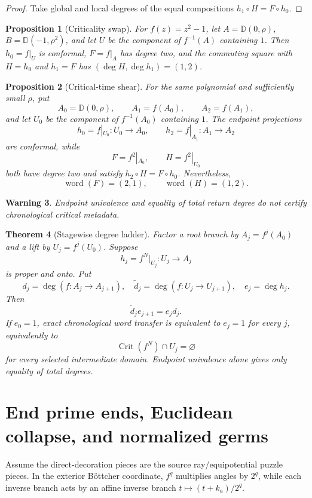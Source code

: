 \documentclass[11pt]{article}
\newtheorem{theorem}{Theorem}[section]
\newtheorem{proposition}[theorem]{Proposition}
\newtheorem{warning}[theorem]{Warning}
\theoremstyle{definition}
\theoremstyle{remark}
\newcommand{\Crit}{\operatorname{Crit}}
\newcommand{\word}{\operatorname{word}}
\newcommand{\D}{\mathbb D}
\begin{document}
\begin{proof}
Take global and local degrees of the equal compositions $h_1\circ H=F\circ h_0$.
\end{proof}

\begin{proposition}[Criticality swap]\label{prop:swap}
For $f(z)=z^2-1$, let $A=\D(0,\rho)$, $B=\D(-1,\rho^2)$, and let $U$ be the component of $f^{-1}(A)$ containing $1$.  Then $h_0=f|_U$ is conformal, $F=f|_A$ has degree two, and the commuting square with $H=h_0$ and $h_1=F$ has $(\deg H,\deg h_1)=(1,2)$.
\end{proposition}

\begin{proposition}[Critical-time shear]\label{prop:shear}
For the same polynomial and sufficiently small $\rho$, put
\[
 A_0=\D(0,\rho),\qquad A_1=f(A_0),\qquad A_2=f(A_1),
\]
and let $U_0$ be the component of $f^{-1}(A_0)$ containing $1$.  The endpoint projections
\[
 h_0=f|_{U_0}:U_0\to A_0,
 \qquad
 h_2=f|_{A_1}:A_1\to A_2
\]
are conformal, while
\[
 F=f^2|_{A_0},\qquad H=f^2|_{U_0}
\]
both have degree two and satisfy $h_2\circ H=F\circ h_0$.  Nevertheless,
\[
 \word(F)=(2,1),\qquad \word(H)=(1,2).
\]
\end{proposition}

\begin{warning}
Endpoint univalence and equality of total return degree do not certify chronological critical metadata.
\end{warning}

\begin{theorem}[Stagewise degree ladder]\label{thm:ladder}
Factor a root branch by $A_j=f^j(A_0)$ and a lift by $U_j=f^j(U_0)$.  Suppose
\[
 h_j=f^N|_{U_j}:U_j\to A_j
\]
is proper and onto.  Put
\[
 d_j=\deg(f:A_j\to A_{j+1}),\quad
 \widetilde d_j=\deg(f:U_j\to U_{j+1}),\quad
 e_j=\deg h_j.
\]
Then
\[
 \widetilde d_j e_{j+1}=e_jd_j.
\]
If $e_0=1$, exact chronological word transfer is equivalent to $e_j=1$ for every $j$, equivalently to
\[
 \Crit(f^N)\cap U_j=\varnothing
\]
for every selected intermediate domain.  Endpoint univalence alone gives only equality of total degrees.
\end{theorem}

\section{End prime ends, Euclidean collapse, and normalized germs}

Assume the direct-decoration pieces are the source ray/equipotential puzzle pieces.  In the exterior B\"ottcher coordinate, $f^q$ multiplies angles by $2^q$, while each inverse branch acts by an affine inverse branch $t\mapsto(t+k_a)/2^q$.
\end{document}
